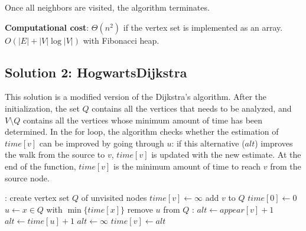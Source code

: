 \documentclass{article}
\begin{document}
Once all neighbors are visited, the algorithm terminates.

\begin{framed}
  \noindent
  \textbf{Computational cost}: $\Theta(n^{2})$ if the vertex set is implemented as an array. $O(|E|+|V|\log |V|)$ with Fibonacci heap.
\end{framed}

\subsection{Solution 2: HogwartsDijkstra}

This solution is a modified version of the Dijkstra’s algorithm. After the initialization, the set $Q$ contains all the vertices that needs to be analyzed, and $V \setminus Q$ contains all the vertices whose minimum amount of time has been determined. In the for loop, the algorithm checks whether the estimation of $time[v]$ can be improved by going through $u$: if this alternative ($alt$) improves the walk from the source to $v$, $time[v]$ is updated with the new estimate. At the end of the function, $time[v]$ is the minimum amount of time to reach $v$ from the source node.

\bigskip

\begin{algorithmic}[1]
  :
  \State create vertex set $Q$ of unvisited nodes
        
      \State $time[v] \gets \infty$  
      \State add $v$ to $Q$          
  \EndFor
  \State $time[0] \gets 0$ 
      \State $u \gets x \in Q$ with $\min\{time[x]\}$
      \State remove $u$ from $Q$
      :
              \State $alt \gets appear[v] + 1$ 
              \State $alt \gets time[u] + 1$       
          \Else                        
              \State $alt \gets \infty$            
          \EndIf
              \State $time[v] \gets alt$           
          \EndIf
      \EndFor
  \EndWhile
  \State {}
  \EndFunction
\end{algorithmic}
\end{document}
